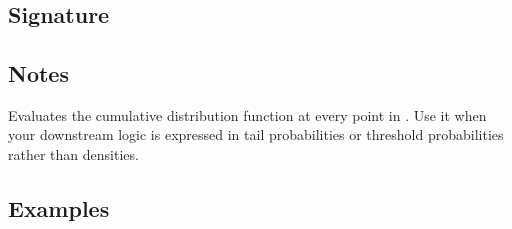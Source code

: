 \documentclass[letterpaper,10pt,english]{sphinxmanual}
\begin{document}
\section{}
\label{\detokenize{api_reference:cdf}}

\subsection{Signature}
\label{\detokenize{api_reference:id13}}
\begin{sphinxVerbatim}[commandchars=\\\{\}]
\end{sphinxVerbatim}


\subsection{Notes}
\label{\detokenize{api_reference:id14}}
\sphinxAtStartPar
Evaluates the cumulative distribution function at every point in . Use it when your downstream logic is expressed in tail probabilities or threshold probabilities rather than densities.


\subsection{Examples}
\label{\detokenize{api_reference:id15}}
\begin{sphinxVerbatim}[commandchars=\\\{\}]
\end{sphinxVerbatim}
\end{document}

